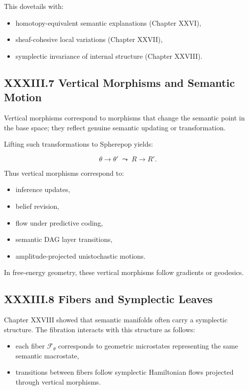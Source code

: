 \documentclass[11pt,letterpaper]{article}
\begin{document}
This dovetails with:

\begin{itemize}
    \item homotopy-equivalent semantic explanations (Chapter XXVI),
    \item sheaf-cohesive local variations (Chapter XXVII),
    \item symplectic invariance of internal structure (Chapter XXVIII).
\end{itemize}

\subsection{XXXIII.7 Vertical Morphisms and Semantic Motion}

Vertical morphisms correspond to morphisms that change the semantic point in the base space; they reflect genuine semantic updating or transformation.

Lifting such transformations to Spherepop yields:

\[
\theta \to \theta' \;\leadsto\; R \to R'.
\]

Thus vertical morphisms correspond to:

\begin{itemize}
    \item inference updates,
    \item belief revision,
    \item flow under predictive coding,
    \item semantic DAG layer transitions,
    \item amplitude-projected unistochastic motions.
\end{itemize}

In free-energy geometry, these vertical morphisms follow gradients or geodesics.

\subsection{XXXIII.8 Fibers and Symplectic Leaves}

Chapter XXVIII showed that semantic manifolds often carry a symplectic structure. The fibration interacts with this structure as follows:

\begin{itemize}
    \item each fiber $\mathcal{F}_\theta$ corresponds to geometric microstates representing the same semantic macrostate,
    \item transitions between fibers follow symplectic Hamiltonian flows projected through vertical morphisms.
\end{itemize}
\end{document}
